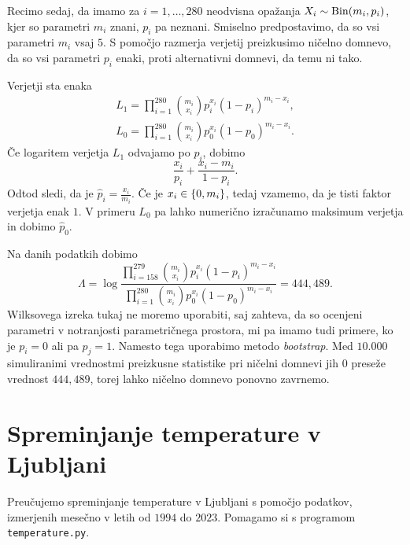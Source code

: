 \documentclass[12pt, a4paper]{article}
\begin{document}

Recimo sedaj, da imamo za $i = 1, \dots, 280$ neodvisna opažanja
$X_i \sim \operatorname{Bin}(m_i, p_i)$, kjer so parametri $m_i$ znani, 
$p_i$ pa neznani. Smiselno predpostavimo, da so vsi 
parametri $m_i$ vsaj $5$. S pomočjo razmerja verjetij preizkusimo 
ničelno domnevo, da so vsi parametri $p_i$ enaki, proti 
alternativni domnevi, da temu ni tako.

Verjetji sta enaka
\begin{align*}
    L_1 = \prod_{i=1}^{280} \binom{m_i}{x_i}p_i^{x_i}(1-p_i)^{m_i-x_i}, \\
    L_0 = \prod_{i=1}^{280} \binom{m_i}{x_i}p_0^{x_i}(1-p_0)^{m_i-x_i}.  
\end{align*}
Če logaritem verjetja $L_1$ odvajamo po $p_i$, dobimo
\[
    \frac{x_i}{p_i} + \frac{x_i-m_i}{1-p_i}.
\]
Odtod sledi, da je $\hat p_i = \frac{x_i}{m_i}$. Če je $x_i \in 
\left\{0, m_i\right\}$, tedaj vzamemo, da je tisti faktor verjetja enak $1$.
V primeru $L_0$ pa lahko numerično izračunamo maksimum verjetja in 
dobimo $\hat p_0$.

Na danih podatkih dobimo
\[
    \Lambda = \log\frac{\prod_{i=158}^{279} \binom{m_i}{x_i}p_i^{x_i}(1-p_i)^{m_i-x_i}}
    {\prod_{i=1}^{280} \binom{m_i}{x_i}p_0^{x_i}(1-p_0)^{m_i-x_i}}
    = 444{,}489.
\]
Wilksovega izreka tukaj ne moremo uporabiti, saj zahteva, da 
so ocenjeni parametri v notranjosti parametričnega prostora,
mi pa imamo tudi primere, ko je $p_i = 0$ ali pa $p_j = 1$. 
Namesto tega uporabimo metodo \textit{bootstrap}.
Med $10.000$ simuliranimi vrednostmi preizkusne statistike pri 
ničelni domnevi jih $0$ preseže vrednost $444{,}489$, torej 
lahko ničelno domnevo ponovno zavrnemo.

\newpage

\section{Spreminjanje temperature v Ljubljani}

Preučujemo spreminjanje temperature v Ljubljani s 
pomočjo podatkov, izmerjenih mesečno v letih od $1994$ do $2023$.
Pomagamo si s programom \texttt{temperature.py}.
\end{document}
